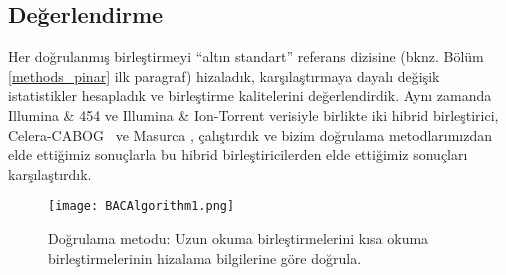 \documentclass[12pt,a4paper]{cibb}
\begin{document}
\subsection{Değerlendirme}
Her doğrulanmış birleştirmeyi ``altın standart'' referans dizisine (bknz. Bölüm \ref{methods_pinar} ilk paragraf) hizaladık, karşılaştırmaya dayalı değişik istatistikler hesapladık ve birleştirme kalitelerini değerlendirdik.
Aynı zamanda Illumina \& 454 ve Illumina \& Ion-Torrent verisiyle birlikte iki hibrid birleştirici, Celera-CABOG~\cite{cabogMiller:2008} ve Masurca \cite{masurcaZimin:2013}, çalıştırdık ve bizim doğrulama metodlarımızdan elde ettiğimiz sonuçlarla bu hibrid birleştiricilerden elde ettiğimiz sonuçları karşılaştırdık.

\begin{figure*}[htbp]
\centerline{\texttt{[image: BACAlgorithm1.png]}}
\caption{Doğrulama metodu: Uzun okuma birleştirmelerini kısa okuma birleştirmelerinin hizalama bilgilerine göre doğrula.}
\label{correction}
\end{figure*}
\end{document}
